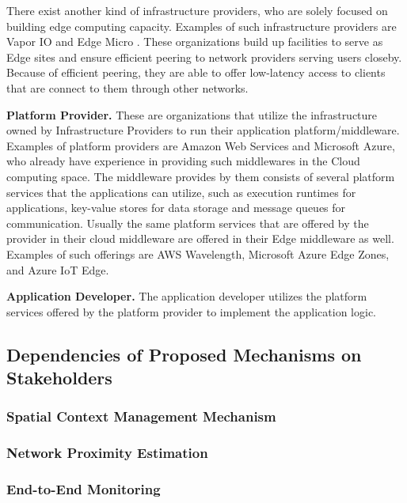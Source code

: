 \par There exist another kind of infrastructure providers, who are solely focused on building edge computing capacity. Examples of such infrastructure providers are Vapor IO \cite{vaporio} and Edge Micro \cite{edge_micro}. These organizations build up facilities to serve as Edge sites and ensure efficient peering to network providers serving users closeby. Because of efficient peering, they are able to offer low-latency access to clients that are connect to them through other networks.

\par \noindent \textbf{Platform Provider.} These are organizations that utilize the infrastructure owned by Infrastructure Providers to run their application platform/middleware. Examples of platform providers are Amazon Web Services and Microsoft Azure, who already have experience in providing such middlewares in the Cloud computing space. The middleware provides by them consists of several platform services that the applications can utilize, such as execution runtimes for applications, key-value stores for data storage and message queues for communication. Usually the same platform services that are offered by the provider in their cloud middleware are offered in their Edge middleware as well. Examples of such offerings are AWS Wavelength, Microsoft Azure Edge Zones, and Azure IoT Edge.

\par \noindent  \textbf{Application Developer. } The application developer utilizes the platform services offered by the platform provider to implement the application logic.  

\subsection{Dependencies of Proposed Mechanisms on Stakeholders}

\subsubsection{Spatial Context Management Mechanism}

\subsubsection{Network Proximity Estimation}

\subsubsection{End-to-End Monitoring}

